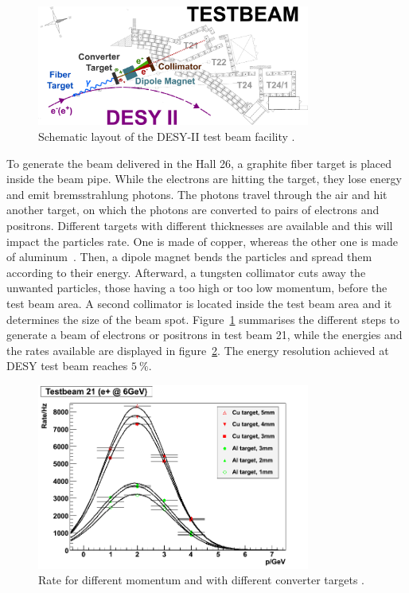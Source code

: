     \begin{figure}[!h]
      \centering
      \includegraphics[width = 0.8\textwidth]{Pictures/X0/desy_tb-sketch.png}
      \caption{Schematic layout of the DESY-II test beam facility \cite{DESYII}.}
      \label{fig:desyTb-sketch}
    \end{figure}

    To generate the beam delivered in the Hall 26, a graphite fiber target is placed inside the beam pipe.
    While the electrons are hitting the target, they lose energy and emit bremsstrahlung photons.
    The photons travel through the air and hit another target, on which the photons are converted to pairs of electrons and positrons.
    Different targets with different thicknesses are available and this will impact the particles rate.
    One is made of copper, whereas the other one is made of aluminum~\cite{ConversionTargets}.
    Then, a dipole magnet bends the particles and spread them according to their energy.
    Afterward, a tungsten collimator cuts away the unwanted particles, those having a too high or too low momentum, before the test beam area.
    A second collimator is located inside the test beam area and it determines the size of the beam spot.
    Figure~\ref{fig:desyTb-sketch} summarises the different steps to generate a beam of electrons or positrons in test beam 21, while the energies and the rates available are displayed in figure~\ref{fig:rateTB21}.
    The energy resolution achieved at \gls{DESY} test beam reaches $5~\%$.

    \begin{figure}[!h]
      \centering
      \includegraphics[width = 0.8\textwidth]{Pictures/X0/rate_vs_p_t21.png}
      \caption{Rate for different momentum and with different converter targets \cite{DESYII}.}
      \label{fig:rateTB21}
    \end{figure}

